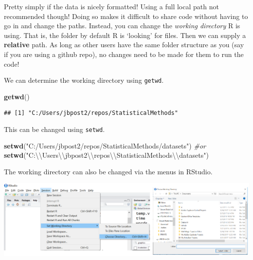 \documentclass[
]{book}
\newenvironment{Shaded}{\begin{snugshade}}{\end{snugshade}}
\newcommand{\CharTok}[1]{\textcolor[rgb]{0.31,0.60,0.02}{#1}}
\newcommand{\CommentTok}[1]{\textcolor[rgb]{0.56,0.35,0.01}{\textit{#1}}}
\newcommand{\KeywordTok}[1]{\textcolor[rgb]{0.13,0.29,0.53}{\textbf{#1}}}
\newcommand{\NormalTok}[1]{#1}
\newcommand{\StringTok}[1]{\textcolor[rgb]{0.31,0.60,0.02}{#1}}
\theoremstyle{definition}
\theoremstyle{definition}
\theoremstyle{definition}
\theoremstyle{remark}
\begin{document}
Pretty simply if the data is nicely formatted! Using a full local path not recommended though! Doing so makes it difficult to share code without having to go in and change the paths. Instead, you can change the \emph{working directory} R is using. That is, the folder by default R is `looking' for files. Then we can supply a \textbf{relative} path. As long as other users have the same folder structure as you (say if you are using a github repo), no changes need to be made for them to run the code!

We can determine the working directory using \texttt{getwd}.

\begin{Shaded}
\begin{Highlighting}[]
\KeywordTok{getwd}\NormalTok{()}
\end{Highlighting}
\end{Shaded}

\begin{verbatim}
## [1] "C:/Users/jbpost2/repos/StatisticalMethods"
\end{verbatim}

This can be changed using \texttt{setwd}.

\begin{Shaded}
\begin{Highlighting}[]
\KeywordTok{setwd}\NormalTok{(}\StringTok{"C:/Users/jbpost2/repos/StatisticalMethods/datasets"}\NormalTok{)}
\CommentTok{#or}
\KeywordTok{setwd}\NormalTok{(}\StringTok{"C:}\CharTok{\textbackslash{}\textbackslash{}}\StringTok{Users}\CharTok{\textbackslash{}\textbackslash{}}\StringTok{jbpost2}\CharTok{\textbackslash{}\textbackslash{}}\StringTok{repos}\CharTok{\textbackslash{}\textbackslash{}}\StringTok{StatisticalMethods}\CharTok{\textbackslash{}\textbackslash{}}\StringTok{datasets"}\NormalTok{)}
\end{Highlighting}
\end{Shaded}

The working directory can also be changed via the menus in RStudio.

\begin{center}\includegraphics[width=0.8\linewidth]{img/setwd} \end{center}
\end{document}
